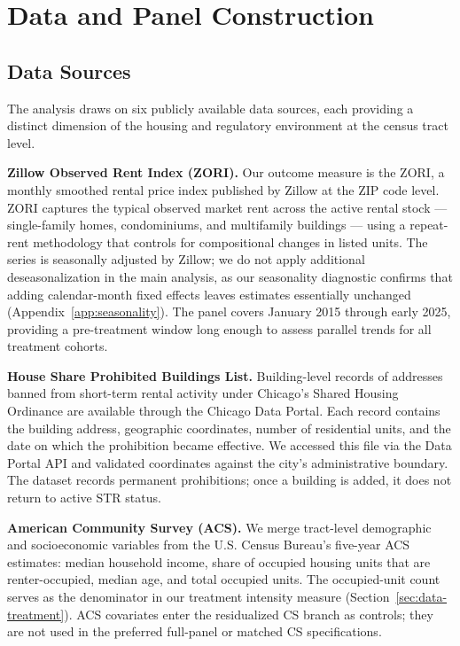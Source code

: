 \section{Data and Panel Construction}\label{sec:data}

\subsection{Data Sources}

The analysis draws on six publicly available data sources, each providing a distinct dimension of the housing and regulatory environment at the census tract level.

\textbf{Zillow Observed Rent Index (ZORI).} Our outcome measure is the ZORI, a monthly smoothed rental price index published by Zillow at the ZIP code level. ZORI captures the typical observed market rent across the active rental stock --- single-family homes, condominiums, and multifamily buildings --- using a repeat-rent methodology that controls for compositional changes in listed units. The series is seasonally adjusted by Zillow; we do not apply additional deseasonalization in the main analysis, as our seasonality diagnostic confirms that adding calendar-month fixed effects leaves estimates essentially unchanged (Appendix~\ref{app:seasonality}). The panel covers January 2015 through early 2025, providing a pre-treatment window long enough to assess parallel trends for all treatment cohorts.

\textbf{House Share Prohibited Buildings List.} Building-level records of addresses banned from short-term rental activity under Chicago's Shared Housing Ordinance are available through the Chicago Data Portal. Each record contains the building address, geographic coordinates, number of residential units, and the date on which the prohibition became effective. We accessed this file via the Data Portal API and validated coordinates against the city's administrative boundary. The dataset records permanent prohibitions; once a building is added, it does not return to active STR status.

\textbf{American Community Survey (ACS).} We merge tract-level demographic and socioeconomic variables from the U.S. Census Bureau's five-year ACS estimates: median household income, share of occupied housing units that are renter-occupied, median age, and total occupied units. The occupied-unit count serves as the denominator in our treatment intensity measure (Section~\ref{sec:data-treatment}). ACS covariates enter the residualized CS branch as controls; they are not used in the preferred full-panel or matched CS specifications.


